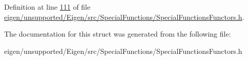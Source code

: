 Definition at line \hyperlink{eigen_2unsupported_2_eigen_2src_2_special_functions_2_special_functions_functors_8h_source_l00111}{111} of file \hyperlink{eigen_2unsupported_2_eigen_2src_2_special_functions_2_special_functions_functors_8h_source}{eigen/unsupported/\+Eigen/src/\+Special\+Functions/\+Special\+Functions\+Functors.\+h}.



The documentation for this struct was generated from the following file\+:\begin{DoxyCompactItemize}
\item 
eigen/unsupported/\+Eigen/src/\+Special\+Functions/\+Special\+Functions\+Functors.\+h\end{DoxyCompactItemize}
